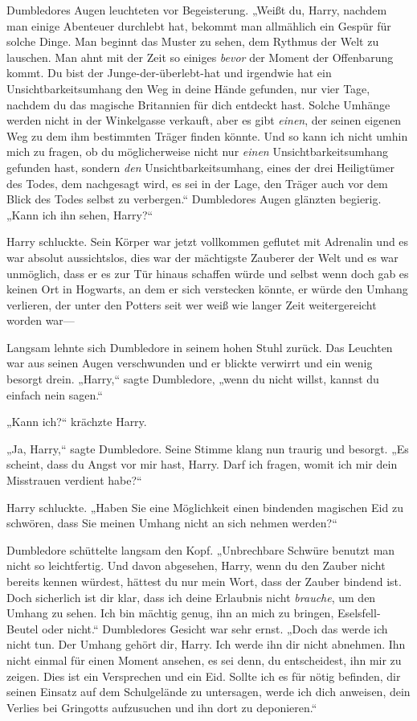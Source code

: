 {Dumbledores Augen leuchteten vor Begeisterung. „Weißt du, Harry, nachdem man einige Abenteuer durchlebt hat, bekommt man allmählich ein Gespür für solche Dinge. Man beginnt das Muster zu sehen, dem Rythmus der Welt zu lauschen. Man ahnt mit der Zeit so einiges \emph{bevor} der Moment der Offenbarung kommt. Du bist der Junge-der-überlebt-hat und irgendwie hat ein Unsichtbarkeitsumhang den Weg in deine Hände gefunden, nur vier Tage, nachdem du das magische Britannien für dich entdeckt hast. Solche Umhänge werden nicht in der Winkelgasse verkauft, aber es gibt \emph{einen}, der seinen eigenen Weg zu dem ihm bestimmten Träger finden könnte. Und so kann ich nicht umhin mich zu fragen, ob du möglicherweise nicht nur \emph{einen} Unsichtbarkeitsumhang gefunden hast, sondern \emph{den} Unsichtbarkeitsumhang, eines der drei Heiligtümer des Todes, dem nachgesagt wird, es sei in der Lage, den Träger auch vor dem Blick des Todes selbst zu verbergen.“ Dumbledores Augen glänzten begierig. „Kann ich ihn sehen, Harry?“

Harry schluckte. Sein Körper war jetzt vollkommen geflutet mit Adrenalin und es war absolut aussichtslos, dies war der mächtigste Zauberer der Welt und es war unmöglich, dass er es zur Tür hinaus schaffen würde und selbst wenn doch gab es keinen Ort in Hogwarts, an dem er sich verstecken könnte, er würde den Umhang verlieren, der unter den Potters seit wer weiß wie langer Zeit weitergereicht worden war—

Langsam lehnte sich Dumbledore in seinem hohen Stuhl zurück. Das Leuchten war aus seinen Augen verschwunden und er blickte verwirrt und ein wenig besorgt drein. „Harry,“ sagte Dumbledore, „wenn du nicht willst, kannst du einfach nein sagen.“

„Kann ich?“ krächzte Harry.

„Ja, Harry,“ sagte Dumbledore. Seine Stimme klang nun traurig und besorgt. „Es scheint, dass du Angst vor mir hast, Harry. Darf ich fragen, womit ich mir dein Misstrauen verdient habe?“

Harry schluckte. „Haben Sie eine Möglichkeit einen bindenden magischen Eid zu schwören, dass Sie meinen Umhang nicht an sich nehmen werden?“

Dumbledore schüttelte langsam den Kopf. „Unbrechbare Schwüre benutzt man nicht so leichtfertig. Und davon abgesehen, Harry, wenn du den Zauber nicht bereits kennen würdest, hättest du nur mein Wort, dass der Zauber bindend ist. Doch sicherlich ist dir klar, dass ich deine Erlaubnis nicht \emph{brauche}, um den Umhang zu sehen. Ich bin mächtig genug, ihn an mich zu bringen, Eselsfell-Beutel oder nicht.“ Dumbledores Gesicht war sehr ernst. „Doch das werde ich nicht tun. Der Umhang gehört dir, Harry. Ich werde ihn dir nicht abnehmen. Ihn nicht einmal für einen Moment ansehen, es sei denn, du entscheidest, ihn mir zu zeigen. Dies ist ein Versprechen und ein Eid. Sollte ich es für nötig befinden, dir seinen Einsatz auf dem Schulgelände zu untersagen, werde ich dich anweisen, dein Verlies bei Gringotts aufzusuchen und ihn dort zu deponieren.“

}
